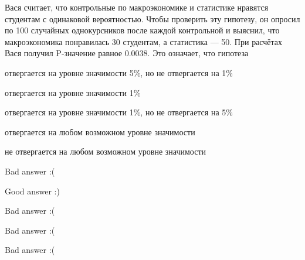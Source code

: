 
\begin{question}
Вася считает, что контрольные по макроэкономике и статистике нравятся
студентам с одинаковой вероятностью. Чтобы проверить эту гипотезу, он
опросил по 100 случайных однокурсников после каждой контрольной и
выяснил, что макроэкономика понравилась 30 студентам, а статистика ---
50. При расчётах Вася получил P-значение равное 0.0038. Это означает,
что гипотеза
\begin{answerlist}
  \item отвергается на уровне значимости 5\%, но не отвергается на 1\%
  \item отвергается на уровне значимости 1\%
  \item отвергается на уровне значимости 1\%, но не отвергается на 5\%
  \item отвергается на любом возможном уровне значимости
  \item не отвергается на любом возможном уровне значимости
\end{answerlist}
\end{question}

\begin{solution}
\begin{answerlist}
  \item Bad answer :(
  \item Good answer :)
  \item Bad answer :(
  \item Bad answer :(
  \item Bad answer :(
\end{answerlist}
\end{solution}

